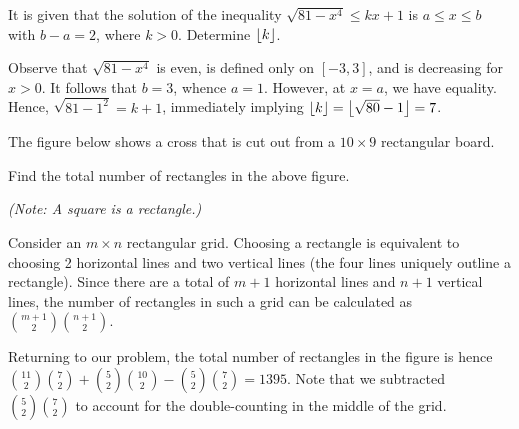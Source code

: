 \clearpage
\begin{question}[7]\label{Q::2021-O-1-4}
    It is given that the solution of the inequality $\sqrt{81 - x^4} \leq kx + 1$ is $a \leq x \leq b$ with $b - a = 2$, where $k > 0$. Determine $\left\lfloor k \right\rfloor$.
\end{question}
\begin{solution*}
    Observe that $\sqrt{81 - x^4}$ is even, is defined only on $[-3, 3]$, and is decreasing for $x > 0$. It follows that $b = 3$, whence $a = 1$. However, at $x = a$, we have equality. Hence, $\sqrt{81 - 1^2} = k + 1$, immediately implying $\left\lfloor k \right\rfloor = \left\lfloor \sqrt{80} - 1 \right\rfloor = 7$.
\end{solution*}

\begin{question}[1395]\label{Q::2021-O-1-5}
    The figure below shows a cross that is cut out from a $10 \times 9$ rectangular board.

    \begin{center}
    \end{center} Find the total number of rectangles in the above figure.

    \noindent\textit{(Note: A square is a rectangle.)}
\end{question}
\begin{solution*}
    Consider an $m \times n$ rectangular grid. Choosing a rectangle is equivalent to choosing 2 horizontal lines and two vertical lines (the four lines uniquely outline a rectangle). Since there are a total of $m+1$ horizontal lines and $n+1$ vertical lines, the number of rectangles in such a grid can be calculated as $\binom{m+1}{2} \binom{n+1}{2}$.

    Returning to our problem, the total number of rectangles in the figure is hence $\binom{11}{2} \binom{7}{2} + \binom{5}{2} \binom{10}{2} - \binom{5}{2} \binom{7}{2} = 1395$. Note that we subtracted $\binom{5}{2} \binom{7}{2}$ to account for the double-counting in the middle of the grid.
\end{solution*}

